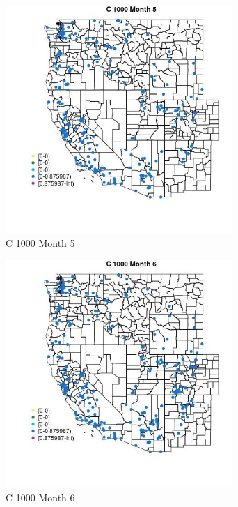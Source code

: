 \begin{figure} 
\centering  
\includegraphics[width=0.77\textwidth]{Code_Outputs/Report_ML_input_PM25_Step4_part_e_de_duplicated_aveswNAs_MapObsMo5C_1000.jpg} 
\caption{\label{fig:Report_ML_input_PM25_Step4_part_e_de_duplicated_aveswNAsMapObsMo5C_1000}C 1000 Month 5} 
\end{figure} 
 

\begin{figure} 
\centering  
\includegraphics[width=0.77\textwidth]{Code_Outputs/Report_ML_input_PM25_Step4_part_e_de_duplicated_aveswNAs_MapObsMo6C_1000.jpg} 
\caption{\label{fig:Report_ML_input_PM25_Step4_part_e_de_duplicated_aveswNAsMapObsMo6C_1000}C 1000 Month 6} 
\end{figure} 
 

